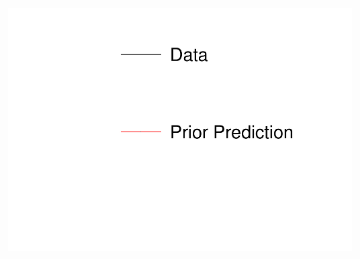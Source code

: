 \begin{figure}[!htbp]
\centering
\begin{subfigure}{.24\textwidth}
  \centering
  \includegraphics[width=\linewidth, clip]{figs/prioronly1dleg.pdf}
\end{subfigure}


\end{figure}
